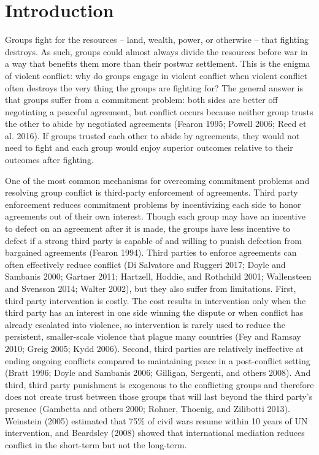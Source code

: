\documentclass[11pt]{article}
\begin{document}
\hypertarget{introduction}{%
\section{Introduction}\label{introduction}}

Groups fight for the resources -- land, wealth, power, or otherwise --
that fighting destroys. As such, groups could almost always divide the
resources before war in a way that benefits them more than their postwar
settlement. This is the enigma of violent conflict: why do groups engage
in violent conflict when violent conflict often destroys the very thing
the groups are fighting for? The general answer is that groups suffer
from a commitment problem: both sides are better off negotiating a
peaceful agreement, but conflict occurs because neither group trusts the
other to abide by negotiated agreements (Fearon 1995; Powell 2006; Reed
et al. 2016). If groups trusted each other to abide by agreements, they
would not need to fight and each group would enjoy superior outcomes
relative to their outcomes after fighting.

One of the most common mechanisms for overcoming commitment problems and
resolving group conflict is third-party enforcement of agreements. Third
party enforcement reduces commitment problems by incentivizing each side
to honor agreements out of their own interest. Though each group may
have an incentive to defect on an agreement after it is made, the groups
have less incentive to defect if a strong third party is capable of and
willing to punish defection from bargained agreements (Fearon 1994).
Third parties to enforce agreements can often effectively reduce
conflict (Di Salvatore and Ruggeri 2017; Doyle and Sambanis 2000;
Gartner 2011; Hartzell, Hoddie, and Rothchild 2001; Wallensteen and
Svensson 2014; Walter 2002), but they also suffer from limitations.
First, third party intervention is costly. The cost results in
intervention only when the third party has an interest in one side
winning the dispute or when conflict has already escalated into
violence, so intervention is rarely used to reduce the persistent,
smaller-scale violence that plague many countries (Fey and Ramsay 2010;
Greig 2005; Kydd 2006). Second, third parties are relatively ineffective
at ending ongoing conflicts compared to maintaining peace in a
post-conflict setting (Bratt 1996; Doyle and Sambanis 2006; Gilligan,
Sergenti, and others 2008). And third, third party punishment is
exogenous to the conflicting groups and therefore does not create trust
between those groups that will last beyond the third party's presence
(Gambetta and others 2000; Rohner, Thoenig, and Zilibotti 2013).
Weinstein (2005) estimated that 75\% of civil wars resume within 10
years of UN intervention, and Beardsley (2008) showed that international
mediation reduces conflict in the short-term but not the long-term.
\end{document}
